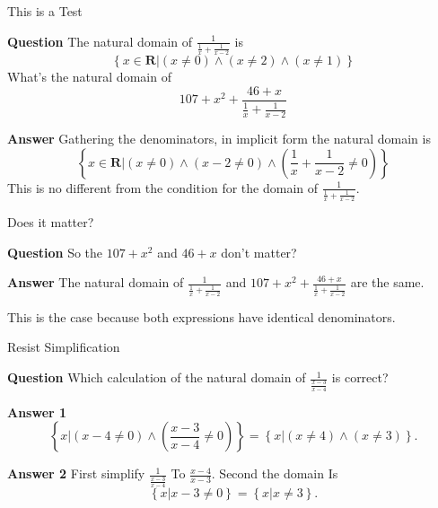 \documentclass[usenames,dvipsnames,fleqn,leqno,10pt, pdflatex]{beamer}
\newcommand{\reals}{\mathbf{R}}
\begin{document}
\begin{frame}{This is a Test}

\textbf{Question} The natural domain of 
\(\frac{1}{\frac{1}{x} + \frac{1}{x-2}} \) is 
\begin{equation*}
    \left\{ x \in \reals \bigg | \left(x \neq 0\right)  
    \land \left(x  \neq 2 \right) \land  
    \left(x \neq 1 \right) \right\}
\end{equation*}
What's the natural domain of   
\begin{equation*}
    107 + x^2 + \frac{46 + x}{\frac{1}{x} + \frac{1}{x-2}} 
\end{equation*}  

\textbf{Answer} Gathering the denominators, in implicit form the
natural domain is
\begin{equation*}
    \left\{ x \in \reals \bigg | \left(x \neq 0 \right)  
    \land \left(x-2 \neq 0 \right) \land  
    \left(\frac{1}{x} + \frac{1}{x-2} \neq 0 \right) \right\}
\end{equation*}
This is no different from the condition for the domain of 
\(\frac{1}{\frac{1}{x} + \frac{1}{x-2}}\).

\end{frame}

\begin{frame}{Does it matter?}

\textbf{Question} So the \(107 + x^2\) and \(46 + x\) don't matter?

\textbf{Answer} The natural domain of \(\frac{1}{\frac{1}{x} + \frac{1}{x-2}} \)
and \( 107 + x^2 + \frac{46 + x}{\frac{1}{x} + \frac{1}{x-2}}  \) are
the same. 

This is the case because both expressions have identical denominators.

\vfill

\end{frame}

\begin{frame}{Resist Simplification}

\textbf{Question} Which calculation of the natural domain
of  \(\frac{1}{\frac{x-3}{x-4}} \) is correct?

\textbf{Answer 1}
\[
  \left  \{ x \big | \left(x-4 \neq 0\right) \land  
      \left(\frac{x-3}{x-4} \neq 0 \right) \right \} =
      \left \{ x \big | \left(x \neq 4 \right) \land  
      \left(x \neq 3 \right) \right \}.
\]

\textbf{Answer 2} First simplify \(\frac{1}{\frac{x-3}{x-4}} \) To
\(\frac{x-4}{x-3} \). Second the domain Is
\[
    \left \{ x \big | x-3 \neq 0  \right \} =
       \left \{ x \big | x \neq 3  \right \}.
 \]

\end{frame}
\end{document}
